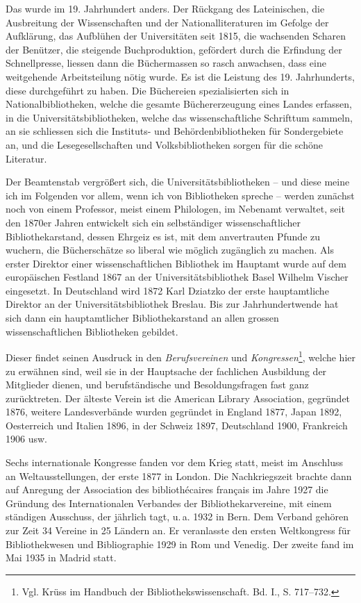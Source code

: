 \documentclass[a4paper,
fontsize=11pt,
oneside,
numbers=noperiodatend,
parskip=half-,
bibliography=totoc,
final
]{scrartcl}
\begin{document}
Das wurde im 19. Jahrhundert anders. Der Rückgang des Lateinischen, die
Ausbreitung der Wissenschaften und der Nationalliteraturen im Gefolge
der Aufklärung, das Aufblühen der Universitäten seit 1815, die
wachsenden Scharen der Benützer, die steigende Buchproduktion, gefördert
durch die Erfindung der Schnellpresse, liessen dann die Büchermassen so
rasch anwachsen, dass eine weitgehende Arbeitsteilung nötig wurde. Es
ist die Leistung des 19. Jahrhunderts, diese durchgeführt zu haben. Die
Büchereien spezialisierten sich in Nationalbibliotheken, welche die
gesamte Büchererzeugung eines Landes erfassen, in die
Universitätsbibliotheken, welche das wissenschaftliche Schrifttum
sammeln, an sie schliessen sich die Instituts- und Behördenbibliotheken
für Sondergebiete an, und die Lesegesellschaften und Volksbibliotheken
sorgen für die schöne Literatur.

Der Beamtenstab vergrößert sich, die Universitätsbibliotheken -- und
diese meine ich im Folgenden vor allem, wenn ich von Bibliotheken
spreche -- werden zunächst noch von einem Professor, meist einem
Philologen, im Nebenamt verwaltet, seit den 1870er Jahren entwickelt
sich ein selbständiger wissenschaftlicher Bibliothekarstand, dessen
Ehrgeiz es ist, mit dem anvertrauten Pfunde zu wuchern, die
Bücherschätze so liberal wie möglich zugänglich zu machen. Als erster
Direktor einer wissenschaftlichen Bibliothek im Hauptamt wurde auf dem
europäischen Festland 1867 an der Universitätsbibliothek Basel Wilhelm
Vischer eingesetzt. In Deutschland wird 1872 Karl Dziatzko der erste
hauptamtliche Direktor an der Universitätsbibliothek Breslau. Bis zur
Jahrhundertwende hat sich dann ein hauptamtlicher Bibliothekarstand an
allen grossen wissenschaftlichen Bibliotheken gebildet.

Dieser findet seinen Ausdruck in den \emph{Berufsvereinen} und
\emph{Kongressen}\footnote{Vgl. Krüss im Handbuch der
  Bibliothekswissenschaft. Bd. I., S. 717--732.}, welche hier zu
erwähnen sind, weil sie in der Hauptsache der fachlichen Ausbildung der
Mitglieder dienen, und berufständische und Besoldungsfragen fast ganz
zurücktreten. Der älteste Verein ist die American Library Association,
gegründet 1876, weitere Landesverbände wurden gegründet in England 1877,
Japan 1892, Oesterreich und Italien 1896, in der Schweiz 1897,
Deutschland 1900, Frankreich 1906 usw.

Sechs internationale Kongresse fanden vor dem Krieg statt, meist im
Anschluss an Weltausstellungen, der erste 1877 in London. Die
Nachkriegszeit brachte dann auf Anregung der Association des
bibliothécaires français im Jahre 1927 die Gründung des Internationalen
Verbandes der Bibliothekarvereine, mit einem ständigen Ausschuss, der
jährlich tagt, u.\,a. 1932 in Bern. Dem Verband gehören zur Zeit 34
Vereine in 25 Ländern an. Er veranlasste den ersten Weltkongress für
Bibliothekwesen und Bibliographie 1929 in Rom und Venedig. Der zweite
fand im Mai 1935 in Madrid statt.
\end{document}
